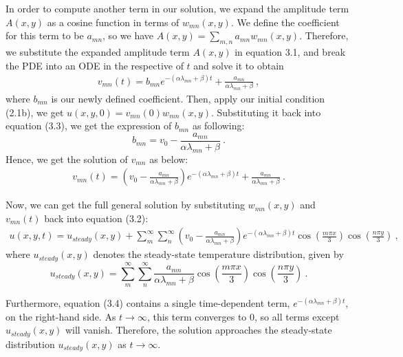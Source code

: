 \documentclass{article}
\begin{document}
\vspace{3mm}

\noindent In order to compute another term in our solution, we expand the amplitude term $A(x,y)$ as a cosine function in terms of $w_{mn}(x,y)$. We define the coefficient for this term to be $a_{mn}$, so we have $A(x,y)= \sum_{m,n} a_{mn}w_{mn}(x,y)$. Therefore, we substitute the expanded amplitude term $A(x,y)$ in equation 3.1, and break the PDE into an ODE in the respective of $t$ and solve it to obtain
\begin{align*}
    v_{mn}(t) = b_{mn}e^{-(\alpha \lambda_{mn}+\beta)t}+\frac{a_{mn}}{\alpha \lambda_{mn}+\beta} \ , \tag{3.3}
\end{align*}
where $b_{mn}$ is our newly defined coefficient. Then, apply our initial condition (2.1b), we get $u(x,y,0) = v_{mn}(0)w_{mn}(x,y)$. Substituting it back into equation (3.3), we get the expression of $b_{mn}$ as following:
$$
b_{mn} = v_0 - \frac{a_{mn}}{\alpha \lambda_{mn}+\beta} \ .
$$
Hence, we get the solution of $v_{mn}$ as below:
\begin{align*}
    v_{mn}(t) = \left(v_0 - \frac{a_{mn}}{\alpha \lambda_{mn}+\beta}\right)e^{-(\alpha \lambda_{mn}+\beta)t}+\frac{a_{mn}}{\alpha \lambda_{mn}+\beta} \ .
\end{align*}

\noindent Now, we can get the full general solution by substituting $w_{mn}(x,y)$ and $v_{mn}(t)$ back into equation (3.2):
\begin{align*}
    u(x,y,t) =  u_{steady}(x,y)+ \sum_{m}^\infty \sum_{n}^\infty \left(v_0 - \frac{a_{mn}}{\alpha \lambda_{mn}+\beta}\right)e^{-(\alpha \lambda_{mn}+\beta)t}\cos\left(\frac{m\pi x}{3}\right)\cos\left(\frac{n\pi y}{3}\right) \ ,  \tag{3.4}
\end{align*}
where $u_{steady}(x,y)$ denotes the steady-state temperature distribution, given by
$$
u_{steady}(x,y) = \sum_{m}^\infty \sum_{n}^\infty  \frac{a_{mn}}{\alpha \lambda_{mn}+\beta}\cos\left(\frac{m\pi x}{3}\right)\cos\left(\frac{n\pi y}{3}\right) \ .
$$

\noindent Furthermore, equation (3.4) contains a single time-dependent term, $e^{-(\alpha \lambda_{mn}+\beta)t}$, on the right-hand side. As $t \to \infty$, this term converges to 0, so all terms except $u_{steady}(x,y)$ will vanish. Therefore, the solution approaches the steady-state distribution $u_{steady}(x,y)$ as $t\to \infty$.
\end{document}
